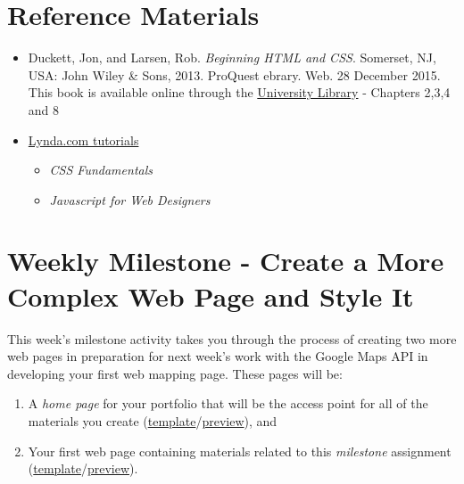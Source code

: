 \documentclass[]{book}
\providecommand{\tightlist}{%
  \setlength{\itemsep}{0pt}\setlength{\parskip}{0pt}}
\begin{document}
\section{Reference Materials}\label{week02-reference}

\begin{itemize}
\item
  Duckett, Jon, and Larsen, Rob. \emph{Beginning HTML and CSS}.
  Somerset, NJ, USA: John Wiley \& Sons, 2013. ProQuest ebrary. Web. 28
  December 2015. This book is available online through the
  \href{http://site.ebrary.com.libproxy.unm.edu/lib/unma/detail.action?docID=10667426}{University
  Library} - Chapters 2,3,4 and 8
\item
  \href{http://www.lynda.com/SharedPlaylist/2b710369c9ec4d8c964467225c6610ad?org=unm.edu}{Lynda.com
  tutorials}

  \begin{itemize}
  \tightlist
  \item
    \emph{CSS Fundamentals}
  \item
    \emph{Javascript for Web Designers}
  \end{itemize}
\end{itemize}

\section{Weekly Milestone - Create a More Complex Web Page and Style
It}\label{week02-milestone}

This week's milestone activity takes you through the process of creating
two more web pages in preparation for next week's work with the Google
Maps API in developing your first web mapping page. These pages will be:

\begin{enumerate}
\def\labelenumi{\arabic{enumi}.}
\item
  A \emph{home page} for your portfolio that will be the access point
  for all of the materials you create
  (\href{https://github.com/UNM-GEOG-485-585/class-materials/blob/master/sample-files/homePageTemplate.html}{template}/\href{http://htmlpreview.github.io/?https://github.com/UNM-GEOG-485-585/class-materials/blob/master/sample-files/homePageTemplate.html}{preview}),
  and
\item
  Your first web page containing materials related to this
  \emph{milestone} assignment
  (\href{https://github.com/UNM-GEOG-485-585/class-materials/blob/master/sample-files/assignmentTemplate.html}{template}/\href{http://htmlpreview.github.io/?https://github.com/UNM-GEOG-485-585/class-materials/blob/master/sample-files/assignmentTemplate.html}{preview}).
\end{enumerate}
\end{document}

